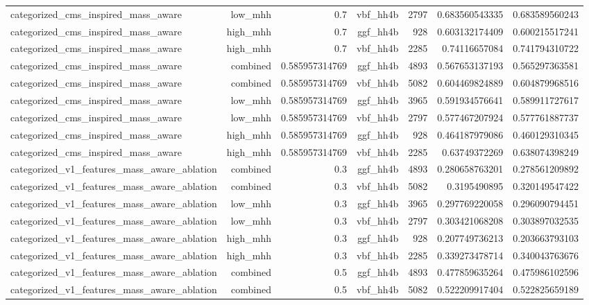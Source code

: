 \begin{table}[htbp]
{\begin{tabular}{lrrrrrr}
categorized\_cms\_inspired\_mass\_aware & low\_mhh & 0.7 & vbf\_hh4b & 2797 & 0.683560543335 & 0.683589560243 \\
categorized\_cms\_inspired\_mass\_aware & high\_mhh & 0.7 & ggf\_hh4b & 928 & 0.603132174409 & 0.600215517241 \\
categorized\_cms\_inspired\_mass\_aware & high\_mhh & 0.7 & vbf\_hh4b & 2285 & 0.74116657084 & 0.741794310722 \\
categorized\_cms\_inspired\_mass\_aware & combined & 0.585957314769 & ggf\_hh4b & 4893 & 0.567653137193 & 0.565297363581 \\
categorized\_cms\_inspired\_mass\_aware & combined & 0.585957314769 & vbf\_hh4b & 5082 & 0.604469824889 & 0.604879968516 \\
categorized\_cms\_inspired\_mass\_aware & low\_mhh & 0.585957314769 & ggf\_hh4b & 3965 & 0.591934576641 & 0.589911727617 \\
categorized\_cms\_inspired\_mass\_aware & low\_mhh & 0.585957314769 & vbf\_hh4b & 2797 & 0.577467207924 & 0.577761887737 \\
categorized\_cms\_inspired\_mass\_aware & high\_mhh & 0.585957314769 & ggf\_hh4b & 928 & 0.464187979086 & 0.460129310345 \\
categorized\_cms\_inspired\_mass\_aware & high\_mhh & 0.585957314769 & vbf\_hh4b & 2285 & 0.63749372269 & 0.638074398249 \\
categorized\_v1\_features\_mass\_aware\_ablation & combined & 0.3 & ggf\_hh4b & 4893 & 0.280658763201 & 0.278561209892 \\
categorized\_v1\_features\_mass\_aware\_ablation & combined & 0.3 & vbf\_hh4b & 5082 & 0.3195490895 & 0.320149547422 \\
categorized\_v1\_features\_mass\_aware\_ablation & low\_mhh & 0.3 & ggf\_hh4b & 3965 & 0.297769220058 & 0.296090794451 \\
categorized\_v1\_features\_mass\_aware\_ablation & low\_mhh & 0.3 & vbf\_hh4b & 2797 & 0.303421068208 & 0.303897032535 \\
categorized\_v1\_features\_mass\_aware\_ablation & high\_mhh & 0.3 & ggf\_hh4b & 928 & 0.207749736213 & 0.203663793103 \\
categorized\_v1\_features\_mass\_aware\_ablation & high\_mhh & 0.3 & vbf\_hh4b & 2285 & 0.339273478714 & 0.340043763676 \\
categorized\_v1\_features\_mass\_aware\_ablation & combined & 0.5 & ggf\_hh4b & 4893 & 0.477859635264 & 0.475986102596 \\
categorized\_v1\_features\_mass\_aware\_ablation & combined & 0.5 & vbf\_hh4b & 5082 & 0.522209917404 & 0.522825659189 \\

\end{tabular}}
\end{table}
